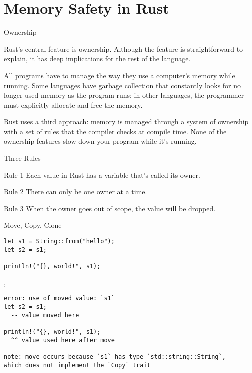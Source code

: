 \section{Memory Safety in Rust}


\begin{frame}{Ownership}

Rust's central feature is ownership.
Although the feature is straightforward to explain,
it has deep implications for the rest of the language.

All programs have to manage the way they use a
computer's memory while running. Some languages
have garbage collection that constantly looks for
no longer used memory as the program runs;
in other languages, the programmer must explicitly
allocate and free the memory.

Rust uses a third approach: memory is managed
through a system of ownership with a set of rules
that the compiler checks at compile time. None of
the ownership features slow down your program
while it's running.

\end{frame}


\begin{frame}[label={threerules}]{Three Rules}

\begin{block}{Rule 1}
Each value in Rust has a variable that’s called its owner.
\end{block}
\begin{block}{Rule 2}
There can only be one owner at a time.
\end{block}
\begin{block}{Rule 3}
When the owner goes out of scope, the value will be dropped.
\end{block}

\end{frame}


\begin{frame}[fragile]{Move, Copy, Clone}

\begin{verbatim}
let s1 = String::from("hello");
let s2 = s1;

println!("{}, world!", s1);
\end{verbatim}

\sep

\begin{verbatim}
error: use of moved value: `s1`
let s2 = s1;
  -- value moved here

println!("{}, world!", s1);
  ^^ value used here after move

note: move occurs because `s1` has type `std::string::String`,
which does not implement the `Copy` trait
\end{verbatim}

\end{frame}

